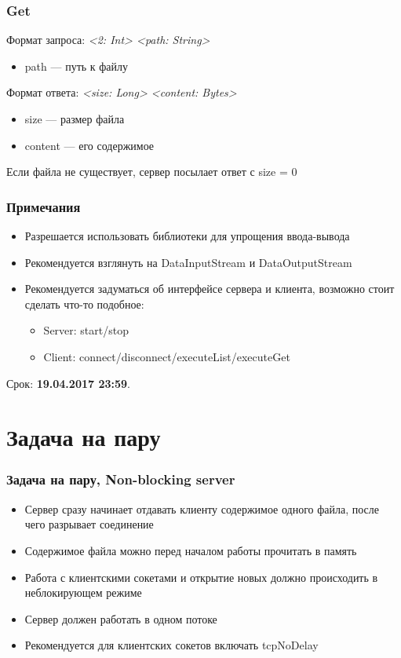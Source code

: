 \documentclass[xetex,mathserif,serif]{beamer}
\begin{document}
	\begin{frame}
		\frametitle{Get}
		Формат запроса: \textit{<2: Int> <path: String>}
		\begin{itemize}
			\item path --- путь к файлу
		\end{itemize}
		
		Формат ответа: \textit{<size: Long> <content: Bytes>}
		\begin{itemize}
			\item size --- размер файла
			\item content --- его содержимое
		\end{itemize}
		Если файла не существует, сервер посылает ответ с size = 0
	\end{frame}

	\begin{frame}
		\frametitle{Примечания}
		\begin{itemize}
			\item Разрешается использовать библиотеки для упрощения ввода-вывода
			\item Рекомендуется взглянуть на DataInputStream и DataOutputStream
			\item Рекомендуется задуматься об интерфейсе сервера и клиента, возможно стоит сделать что-то подобное:
			\begin{itemize}
				\item Server: start/stop
				\item Client: connect/disconnect/executeList/executeGet
			\end{itemize}
		\end{itemize}
		Срок: \textbf{19.04.2017 23:59}.
	\end{frame}

	\section{Задача на пару}

	\begin{frame}
		\frametitle{Задача на пару, Non-blocking server}
		\begin{itemize}
			\item Сервер сразу начинает отдавать клиенту содержимое одного файла, после чего разрывает соединение
			\item Содержимое файла можно перед началом работы прочитать в память
			\item Работа с клиентскими сокетами и открытие новых должно происходить в неблокирующем режиме
			\item Сервер должен работать в одном потоке 
			\item Рекомендуется для клиентских сокетов включать tcpNoDelay
		\end{itemize}
	\end{frame}
\end{document}
